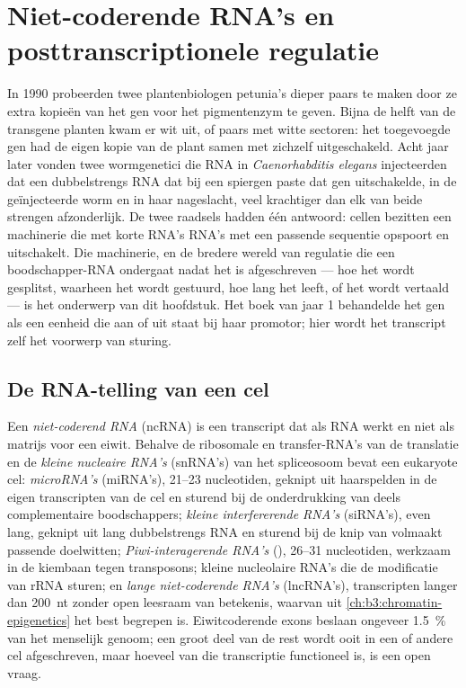 \chapter{Niet-coderende RNA's en posttranscriptionele regulatie}\label{ch:b3:rna-regulation}

In 1990 probeerden twee plantenbiologen petunia's dieper paars te
maken door ze extra kopieën van het gen voor het pigmentenzym te
geven. Bijna de helft van de transgene planten kwam er wit uit, of
paars met witte sectoren: het toegevoegde gen had de eigen kopie van
de plant samen met zichzelf uitgeschakeld. Acht jaar later vonden twee
wormgenetici die RNA in \emph{Caenorhabditis elegans} injecteerden dat
een dubbelstrengs RNA dat bij een spiergen paste dat gen uitschakelde,
in de geïnjecteerde worm en in haar nageslacht, veel krachtiger dan
elk van beide strengen afzonderlijk. De twee raadsels hadden één
antwoord: cellen bezitten een machinerie die met korte RNA's RNA's met
een passende sequentie opspoort en uitschakelt. Die machinerie, en de
bredere wereld van regulatie die een boodschapper-RNA ondergaat nadat
het is afgeschreven --- hoe het wordt gesplitst, waarheen het wordt
gestuurd, hoe lang het leeft, of het wordt vertaald --- is het
onderwerp van dit hoofdstuk. Het boek van jaar 1 behandelde het gen
als een eenheid die aan of uit staat bij haar promotor; hier wordt het
transcript zelf het voorwerp van sturing.

\section{De RNA-telling van een cel}

\begin{definition}\label{def:b3:rna-regulation:ncrna}
Een \emph{niet-coderend RNA} (ncRNA) is een transcript dat als RNA
werkt en niet als matrijs voor een eiwit. Behalve de ribosomale en
transfer-RNA's van de translatie en de \emph{kleine nucleaire RNA's}
(snRNA's) van het spliceosoom bevat een eukaryote cel:
\emph{microRNA's} (miRNA's), \numrange{21}{23} nucleotiden, geknipt uit
haarspelden in de eigen transcripten van de cel en sturend bij de
onderdrukking van deels complementaire boodschappers; \emph{kleine
interfererende RNA's} (siRNA's), even lang, geknipt uit lang
dubbelstrengs RNA en sturend bij de knip van volmaakt passende
doelwitten; \emph{Piwi-interagerende RNA's} (),
\numrange{26}{31} nucleotiden, werkzaam in de kiembaan tegen
transposons; kleine nucleolaire RNA's die de modificatie van rRNA
sturen; en \emph{lange niet-coderende RNA's} (lncRNA's), transcripten
langer dan \qty{200}{nt} zonder open leesraam van betekenis, waarvan
\emph{} uit \cref{ch:b3:chromatin-epigenetics} het best begrepen
is. Eiwitcoderende exons beslaan ongeveer \qty{1.5}{\%} van het
menselijk genoom; een groot deel van de rest wordt ooit in een of
andere cel afgeschreven, maar hoeveel van die transcriptie functioneel
is, is een open vraag.
\end{definition}

